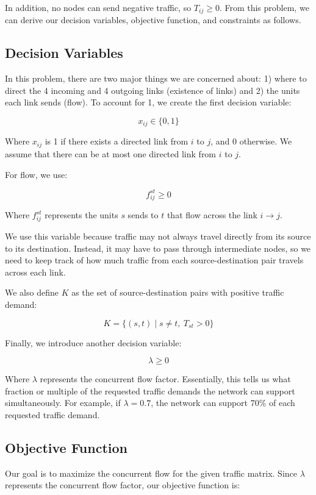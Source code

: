 \documentclass[11pt]{article}
\theoremstyle{definition}
\begin{document}
In addition, no nodes can send negative traffic, so $T_{ij} \geq 0$. From this problem, we can derive our decision variables, objective function, and constraints as follows.

\subsection{Decision Variables}

In this problem, there are two major things we are concerned about: 1) where to direct the 4 incoming and 4 outgoing links (existence of links) and 2) the units each link sends (flow). To account for 1, we create the first decision variable:

\[
x_{ij} \in \{0,1\}
\]

Where $x_{ij}$ is 1 if there exists a directed link from $i$ to $j$, and 0 otherwise. We assume that there can be at most one directed link from $i$ to $j$.

For flow, we use:

\[
f_{ij}^{st} \geq 0
\]

Where $f_{ij}^{st}$ represents the units $s$ sends to $t$ that flow across the link $i \rightarrow j$.

We use this variable because traffic may not always travel directly from its source to its destination. Instead, it may have to pass through intermediate nodes, so we need to keep track of how much traffic from each source-destination pair travels across each link.

We also define $K$ as the set of source-destination pairs with positive traffic demand:

\[
K = \{(s,t) \mid s \neq t,\ T_{st} > 0\}
\]

Finally, we introduce another decision variable:

\[
\lambda \geq 0
\]

Where $\lambda$ represents the concurrent flow factor. Essentially, this tells us what fraction or multiple of the requested traffic demands the network can support simultaneously. For example, if $\lambda = 0.7$, the network can support 70\% of each requested traffic demand.

\subsection{Objective Function}

Our goal is to maximize the concurrent flow for the given traffic matrix. Since $\lambda$ represents the concurrent flow factor, our objective function is:
\end{document}
